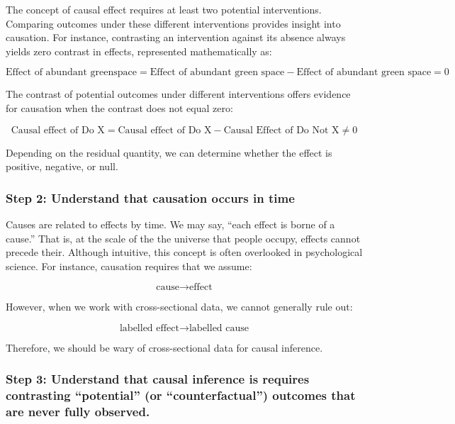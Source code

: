 \documentclass[
  singlecolumn]{article}
\begin{document}
The concept of causal effect requires at least two potential
interventions. Comparing outcomes under these different interventions
provides insight into causation. For instance, contrasting an
intervention against its absence always yields zero contrast in effects,
represented mathematically as:

\[
\text{Effect of abundant greenspace} = \text{Effect of abundant green space} - \text{Effect of abundant green space} = 0
\]

The contrast of potential outcomes under different interventions offers
evidence for causation when the contrast does not equal zero:

\[
\text{Causal effect of Do X} = \text{Causal effect of Do  X} - \text{Causal Effect of Do Not X} \neq 0
\]

Depending on the residual quantity, we can determine whether the effect
is positive, negative, or null.

\hypertarget{step-2-understand-that-causation-occurs-in-time}{%
\subsubsection{Step 2: Understand that causation occurs in
time}\label{step-2-understand-that-causation-occurs-in-time}}

Causes are related to effects by time. We may say, ``each effect is
borne of a cause.'' That is, at the scale of the the universe that
people occupy, effects cannot precede their. Although intuitive, this
concept is often overlooked in psychological science. For instance,
causation requires that we assume:

\[
\text{cause} \to \text{effect}
\]

However, when we work with cross-sectional data, we cannot generally
rule out:

\[
\text{labelled effect} \to \text{labelled cause}
\]

Therefore, we should be wary of cross-sectional data for causal
inference.

\hypertarget{step-3-understand-that-causal-inference-is-requires-contrasting-potential-or-counterfactual-outcomes-that-are-never-fully-observed.}{%
\subsubsection{Step 3: Understand that causal inference is requires
contrasting ``potential'' (or ``counterfactual'') outcomes that are
never fully
observed.}\label{step-3-understand-that-causal-inference-is-requires-contrasting-potential-or-counterfactual-outcomes-that-are-never-fully-observed.}}
\end{document}
